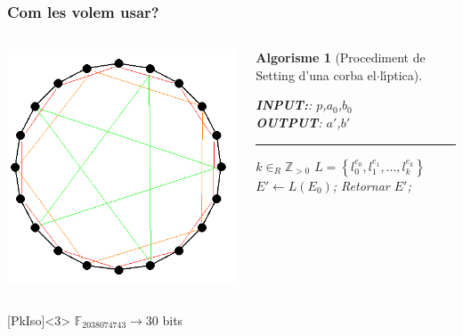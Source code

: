 \documentclass{beamer}
\def\lgem{l\ensuremath{\cdot}l}
\def\ce{corba e\lgem{}\'{\i}ptica}%
\theoremstyle{saltolinea}   			%
\newtheorem{algo}{Algorisme}
\begin{document}
\begin{frame}
  \frametitle{Com les volem usar?}
  \begin{columns}[H]
      \begin{center}
        \includegraphics[width=.8\textwidth]{imatges/estrella2.png}
      \end{center}
      \begin{algo}[Procediment de Setting d'una \ce{}]\label{alg:isogenia}
        \parbox[b]{\linewidth}{%
          \smallskip
          {\bf INPUT:}: $p$,$a_0$,$b_0$\\
          {\bf OUTPUT}: $a'$,$b'$
          \hrule
        }%
        \vspace{-7mm}
        \begin{algorithmic}[1]
          \STATE $k \in_R \mathbb{Z}_{>0}$
          \STATE $L=\left\{l_{0}^{e_{0}},l_{1}^{e_{1}},\dots,l_{k}^{e_{k}}\right\}$
          \STATE \alert<2>{$E' \leftarrow L\left(E_{0}\right)$;}
          \STATE Retornar $E'$;
        \end{algorithmic}
      \end{algo}
  \end{columns}
  \begin{block}{[PkIso]}<3>
    $\mathbb{F}_{2038074743} \rightarrow 30$ bits
  \end{block}
\end{frame}
\end{document}
